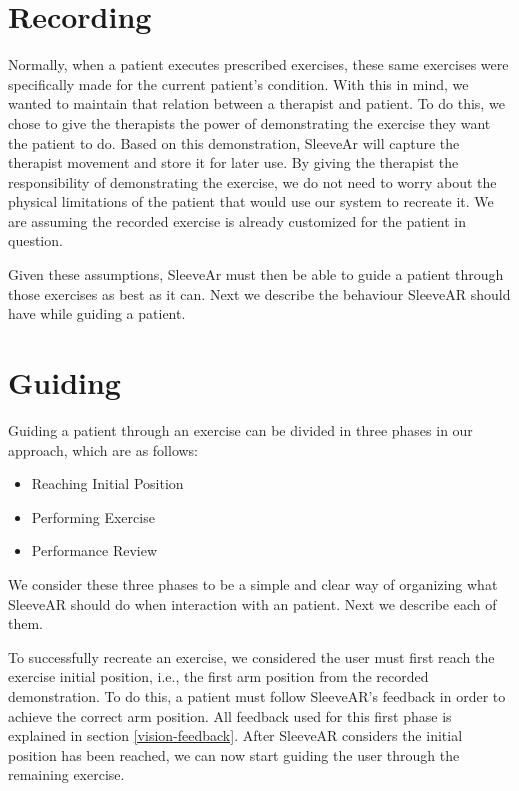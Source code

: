 
\section{Recording}

Normally, when a patient executes prescribed exercises, these same exercises were specifically made for the current patient's condition. 
With this in mind, we wanted to maintain that relation between a therapist and patient. 
To do this, we chose to give the therapists the power of demonstrating the exercise they want the patient to do. 
Based on this demonstration, SleeveAr will capture the therapist movement and store it for later use.
By giving the therapist the responsibility of demonstrating the exercise, we do not need to worry about the physical limitations of the patient that would use our system to recreate it. 
We are assuming the recorded exercise is already customized for the patient in question.

Given these assumptions, SleeveAr must then be able to guide a patient through those exercises as best as it can. Next we describe the behaviour SleeveAR should have while guiding a patient.


\section{Guiding}

Guiding a patient through an exercise can be divided in three phases in our approach, which are as follows:

\begin{itemize}
\item Reaching Initial Position
\item Performing Exercise
\item Performance Review
\end{itemize}

We consider these three phases to be a simple and clear way of organizing what SleeveAR should do when interaction with an patient. Next we describe each of them.

To successfully recreate an exercise, we considered the user must first reach the exercise initial position, i.e., the first arm position from the recorded demonstration.
To do this, a patient must follow SleeveAR's feedback in order to achieve the correct arm position. 
All feedback used for this first phase is explained in section \ref{vision-feedback}.
After SleeveAR considers the initial position has been reached, we can now start guiding the user through the remaining exercise.

